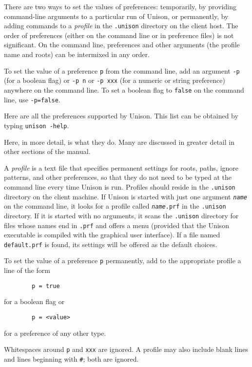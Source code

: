 \documentclass{article}
\newcommand{\ARG}[1]{\texttt{\textit{#1}}}
\begin{document}
There are two ways to set the values of preferences: temporarily, by
providing command-line arguments to a particular run of Unison, or
permanently, by adding commands to a {\em profile} in the {\tt .unison}
directory on the client host.  The order of preferences (either on the
command line or in preference files) is not significant.  On the command
line, preferences and other arguments (the profile name and roots) can be
intermixed in any order.

To set the value of a preference {\tt p} from the command line, add an
argument {\tt -p} (for a boolean flag) or {\tt -p n} or {\tt -p xxx} (for
a numeric or string preference) anywhere on the command line.  To set a
boolean flag to \verb|false| on the command line, use {\tt -p=false}.

Here are all the preferences supported by Unison.  This list can be
  obtained by typing {\tt unison -help}.
\begin{quote}
 
\end{quote}
Here, in more detail, is what they do.  Many are discussed in greater detail
in other sections of the manual.
%
 



A {\em profile} is a text file that specifies permanent settings for
roots, paths, ignore patterns, and other preferences, so that they do
not need to be typed at the command line every time Unison is run.
Profiles should reside in the \verb|.unison| directory on the client
machine.  If Unison is started with just one argument \ARG{name} on
the command line, it looks for a profile called \texttt{\ARG{name}.prf} in
the \verb|.unison| directory.  If it is started with no arguments, it
scans the \verb|.unison| directory for files whose names end in
\verb|.prf| and offers a menu (provided that the Unison executable is compiled with the graphical user interface).  If a file named \verb|default.prf| is
found, its settings will be offered as the default choices.

To set the value of a preference {\tt p} permanently, add to the
appropriate profile a line of the form
\begin{verbatim}
        p = true
\end{verbatim}
for a boolean flag or
\begin{verbatim}
        p = <value>
\end{verbatim}
for a preference of any other type.  

Whitespaces around {\tt p} and {\tt xxx} are ignored.
A profile may also include blank lines and lines beginning
with {\tt \#}; both are ignored.
\end{document}
